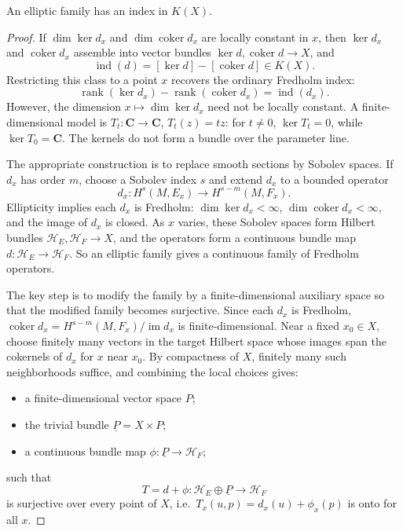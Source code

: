 \documentclass[12pt]{article}
\begin{document}
\begin{theorem}
    An elliptic family has an index in $K(X)$.
\end{theorem}

\begin{proof}
If $\dim\ker d_x$ and $\dim\operatorname{coker}d_x$ are locally constant in $x$, then
$\ker d_x$ and $\operatorname{coker}d_x$ assemble into vector bundles $\ker d,
\operatorname{coker}d\to X$, and
\[
\operatorname{ind}(d) = [\ker d] - [\operatorname{coker}d] \in K(X).
\]
Restricting this class to a point $x$ recovers the ordinary Fredholm index:
\[
\operatorname{rank}(\ker d_x) - \operatorname{rank}(\operatorname{coker}d_x) =
\operatorname{ind}(d_x).
\]
However, the dimension $x\mapsto\dim\ker d_x$ need not be locally constant. A finite-dimensional
model is $T_t:\mathbf C\to\mathbf C$, $T_t(z)=tz$: for $t\ne 0$, $\ker T_t=0$, while
$\ker T_0=\mathbf C$. The kernels do not form a bundle over the parameter line.

The appropriate construction is to replace smooth sections by Sobolev spaces. If $d_x$ has
order $m$, choose a Sobolev index $s$ and extend $d_x$ to a bounded operator
\[
d_x: H^s(M,E_x)\longrightarrow H^{s-m}(M,F_x).
\]
Ellipticity implies each $d_x$ is Fredholm: $\dim\ker d_x<\infty$,
$\dim\operatorname{coker}d_x<\infty$, and the image of $d_x$ is closed. As $x$ varies,
these Sobolev spaces form Hilbert bundles $\mathcal H_E,\mathcal H_F\to X$, and the
operators form a continuous bundle map $d:\mathcal H_E\to\mathcal H_F$. So an elliptic
family gives a continuous family of Fredholm operators.

The key step is to modify the family by a finite-dimensional auxiliary space so that the
modified family becomes surjective. Since each $d_x$ is Fredholm, $\operatorname{coker}
d_x = H^{s-m}(M,F_x)/\operatorname{im}d_x$ is finite-dimensional. Near a fixed $x_0\in X$,
choose finitely many vectors in the target Hilbert space whose images span the cokernels
of $d_x$ for $x$ near $x_0$. By compactness of $X$, finitely many such neighborhoods
suffice, and combining the local choices gives:
\begin{itemize}
\item a finite-dimensional vector space $P$;
\item the trivial bundle $\underline P = X\times P$;
\item a continuous bundle map $\phi:\underline P\to \mathcal H_F$;
\end{itemize}
such that
\[
T = d+\phi : \mathcal H_E\oplus\underline P \longrightarrow \mathcal H_F
\]
is surjective over every point of $X$, i.e.\ $T_x(u,p) = d_x(u)+\phi_x(p)$ is onto for all
$x$.


\end{proof}
\end{document}
